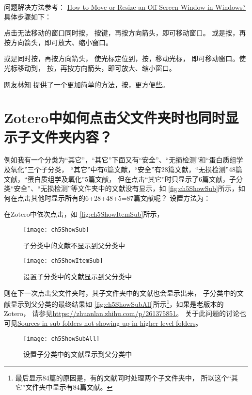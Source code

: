 \documentclass[cn,11pt,chinese]{elegantbook}
\begin{document}
			问题解决方法参考：
			\href{https://www.askvg.com/how-to-move-or-resize-an-off-screen-window-in-windows/}{How to Move or Resize an Off-Screen Window in Windows?}
			具体步骤如下：
			
			点击无法移动的窗口同时按，
			按键，再按方向箭头，即可移动窗口。
			或是按，再按方向箭头，即可放大、缩小窗口。
			
			或是同时按，再按方向箭头，
			使光标定位到，按，移动光标，
			即可移动窗口。使光标移动到，
			按，再按方向箭头，即可放大、缩小窗口。
			
			网友\href{https://www.zhihu.com/people/lin-zhi-70}{林知}
			提供了一个更加简单的方法，按，更方便些。
	\section{Zotero中如何点击父文件夹时也同时显示子文件夹内容？}\label{sec:ShowSub}	
				例如我有一个分类为“其它”，“其它”下面又有“安全”、“无损检测”和“蛋白质组学及氧化”三个子分类，
				“其它”中有6篇文献，“安全”有28篇文献，“无损检测”48篇文献，“蛋白质组学及氧化”5篇文献，
				但在点击“其它”时只显示了6篇文献，子分类“安全”、“无损检测”等文件夹中的文献没有显示，如
				\autoref{fig:ch5ShowSub}所示，如何在点击其他时显示所有的6+28+48+5=87篇文献呢？
				设置方法为：


				
				在Zotero中依次点击，如
				\autoref{fig:ch5ShowItemSub}所示，
				\begin{figure}[ht]
					\centering
					\texttt{[image: ch5ShowSub]}
					\caption{子分类中的文献不显示到父分类中}
					\label{fig:ch5ShowSub}
				\end{figure}	
				\begin{figure}[ht]
					\centering
					\texttt{[image: ch5ShowItemSub]}
					\caption{设置子分类中的文献显示到父分类中}
					\label{fig:ch5ShowItemSub}
				\end{figure}
				则在下一次点击父文件夹时，其子文件夹中的文献也会显示出来，
				子分类中的文献显示到父分类的最终结果如
				\autoref{fig:ch5ShowSubAll}所示\footnote{
				最后显示84篇的原因是，有的文献同时处理两个子文件夹中，
				所以这个“其它”文件夹中显示有84篇文献。}，如果是老版本的
				Zotero，
				请参见\url{https://zhuanlan.zhihu.com/p/261375851}。
				关于此问题的讨论也可见\href{https://forums.zotero.org/discussion/68833/sources-in-sub-folders-not-showing-up-in-higher-level-folders}{Sources in sub-folders not showing up in higher-level folders}。
				\begin{figure}[ht]
					\centering
					\texttt{[image: ch5ShowSubAll]}
					\caption{设置子分类中的文献显示到父分类中}
					\label{fig:ch5ShowSubAll}
				\end{figure}
\end{document}
